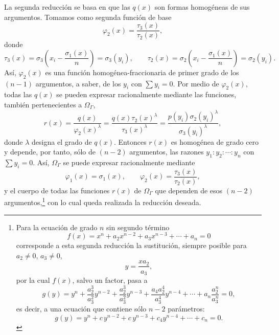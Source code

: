 La segunda reducción se basa en que las $q(x)$ son formas homogéneas de sus argumentos. Tomamos como segunda función de base
\[
\varphi_2(x)=\frac{\tau_3(x)}{\tau_2(x)},
\]
donde
\[
\tau_3(x)=\sigma_3\left(x_i-\frac{\sigma_1(x)}{n}\right)=\sigma_3(y_i),
\qquad
\tau_2(x)=\sigma_2\left(x_i-\frac{\sigma_1(x)}{n}\right)=\sigma_2(y_i).
\]
Así, $\varphi_2(x)$ es una función homogénea-fraccionaria de primer grado de los $(n-1)$ argumentos, a saber, de los $y_i$ con $\sum y_i=0$. Por medio de $\varphi_2(x)$, todas las $q(x)$ se pueden expresar racionalmente mediante las funciones, también pertenecientes a $\Omega_\Gamma$,
\[
r(x)=\frac{q(x)}{\varphi_2(x)^\lambda}
=\frac{q(x)\tau_2(x)^\lambda}{\tau_3(x)^\lambda}
=\frac{p(y_i)\sigma_2(y_i)^\lambda}{\sigma_3(y_i)^\lambda},
\]
donde $\lambda$ designa el grado de $q(x)$. Entonces $r(x)$ es homogénea de grado cero y depende, por tanto, sólo de $(n-2)$ argumentos, las razones $y_1:y_2:\cdots:y_n$ con $\sum y_i=0$. Así, $\Omega_\Gamma$ se puede expresar racionalmente mediante
\[
\varphi_1(x)=\sigma_1(x),
\qquad
\varphi_2(x)=\frac{\tau_3(x)}{\tau_2(x)},
\]
y el cuerpo de todas las funciones $r(x)$ de $\Omega_\Gamma$ que dependen de esos $(n-2)$ argumentos,\footnote{Para la ecuación de grado $n$ sin segundo término
\[
f(x)=x^n+a_2x^{n-2}+a_3x^{n-3}+\cdots+a_n=0
\]
corresponde a esta segunda reducción la sustitución, siempre posible para $a_2\ne0$, $a_3\ne0$,
\[
y=\frac{x a_2}{a_3},
\]
por la cual $f(x)$, salvo un factor, pasa a
\[
g(y)=y^n+\frac{a_2^3}{a_3^2}y^{n-2}+\frac{a_2^3}{a_3^2}y^{n-3}
+\frac{a_4a_2^4}{a_3^4}y^{n-4}+\cdots+a_n\frac{a_2^n}{a_3^n}=0,
\]
es decir, a una ecuación que contiene sólo $n-2$ parámetros:
\[
g(y)=y^n+c\,y^{n-2}+c\,y^{n-3}+c_4y^{n-4}+\cdots+c_n=0.
\]} con lo cual queda realizada la reducción deseada.

